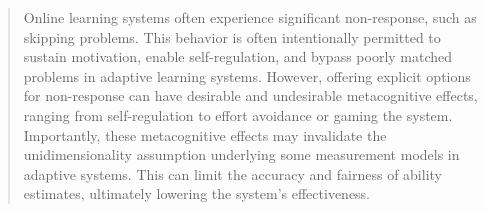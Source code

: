 \documentclass[11pt]{article}
\begin{document}
\begin{abstract}


Online learning systems often experience significant non-response, such as skipping problems. This behavior is often intentionally permitted to sustain motivation, enable self-regulation, and bypass poorly matched problems in adaptive learning systems. However, offering explicit options for non-response can have desirable and undesirable metacognitive effects, ranging from self-regulation to effort avoidance or gaming the system. Importantly, these metacognitive effects may invalidate the unidimensionality assumption underlying some measurement models in adaptive systems. This can limit the accuracy and fairness of ability estimates, ultimately lowering the system's effectiveness.


\end{abstract}
\end{document}

